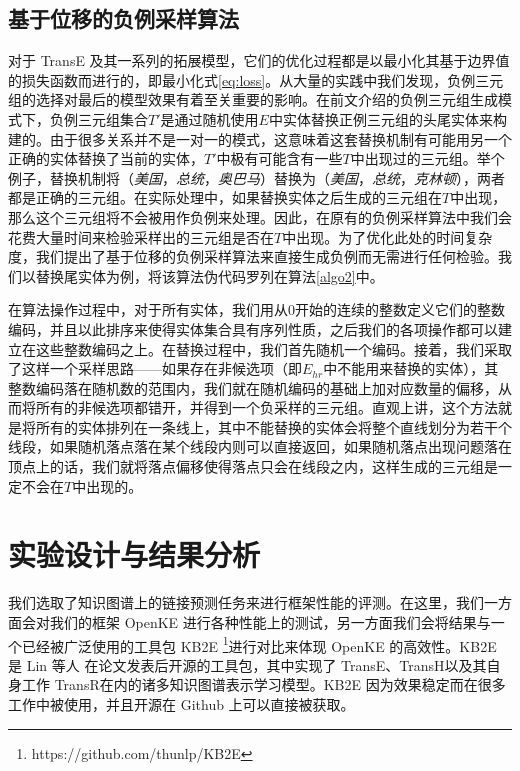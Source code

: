 \subsection{基于位移的负例采样算法}

对于 TransE 及其一系列的拓展模型，它们的优化过程都是以最小化其基于边界值的损失函数而进行的，即最小化式\ref{eq:loss}。从大量的实践中我们发现，负例三元组的选择对最后的模型效果有着至关重要的影响。在前文介绍的负例三元组生成模式下，负例三元组集合$T'$是通过随机使用$E$中实体替换正例三元组的头尾实体来构建的。由于很多关系并不是一对一的模式，这意味着这套替换机制有可能用另一个正确的实体替换了当前的实体，$T'$中极有可能含有一些$T$中出现过的三元组。举个例子，替换机制将（\emph{美国}，\emph{总统}，\emph{奥巴马}）替换为（\emph{美国}，\emph{总统}，\emph{克林顿}），两者都是正确的三元组。在实际处理中，如果替换实体之后生成的三元组在$T$中出现，那么这个三元组将不会被用作负例来处理。因此，在原有的负例采样算法中我们会花费大量时间来检验采样出的三元组是否在$T$中出现。为了优化此处的时间复杂度，我们提出了基于位移的负例采样算法来直接生成负例而无需进行任何检验。我们以替换尾实体为例，将该算法伪代码罗列在算法\ref{algo2}中。

在算法操作过程中，对于所有实体，我们用从$0$开始的连续的整数定义它们的整数编码，并且以此排序来使得实体集合具有序列性质，之后我们的各项操作都可以建立在这些整数编码之上。在替换过程中，我们首先随机一个编码。接着，我们采取了这样一个采样思路——如果存在非候选项（即$E_{hr}$中不能用来替换的实体），其整数编码落在随机数的范围内，我们就在随机编码的基础上加对应数量的偏移，从而将所有的非候选项都错开，并得到一个负采样的三元组。直观上讲，这个方法就是将所有的实体排列在一条线上，其中不能替换的实体会将整个直线划分为若干个线段，如果随机落点落在某个线段内则可以直接返回，如果随机落点出现问题落在顶点上的话，我们就将落点偏移使得落点只会在线段之内，这样生成的三元组是一定不会在$T$中出现的。

\section{实验设计与结果分析}

我们选取了知识图谱上的链接预测任务来进行框架性能的评测。在这里，我们一方面会对我们的框架 OpenKE 进行各种性能上的测试，另一方面我们会将结果与一个已经被广泛使用的工具包 KB2E \footnote{https://github.com/thunlp/KB2E}进行对比来体现 OpenKE 的高效性。KB2E 是 Lin 等人\cite{lin2015learning} 在论文发表后开源的工具包，其中实现了 TransE、TransH以及其自身工作 TransR在内的诸多知识图谱表示学习模型。KB2E 因为效果稳定而在很多工作中被使用，并且开源在 Github 上可以直接被获取。

